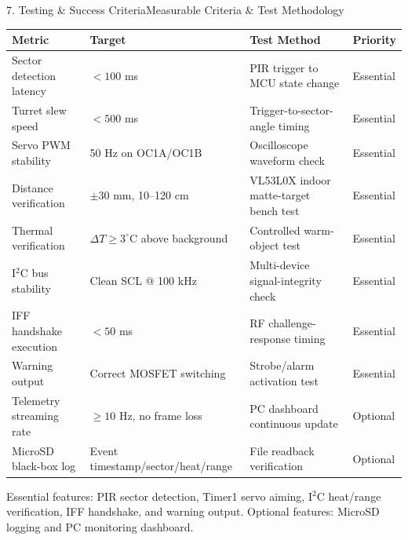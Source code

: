 \documentclass[aspectratio=169, 10pt]{beamer}
\begin{document}
\begin{frame}{7. Testing \& Success Criteria}{Measurable Criteria \& Test Methodology}
    \scriptsize
    \begin{table}
        \centering
        \begin{tabular}{llll}
            \toprule
            \textbf{\color{Accent} Metric} & \textbf{\color{Accent} Target} & \textbf{\color{Accent} Test Method} & \textbf{\color{Accent} Priority} \\
            \midrule
            Sector detection latency & $< 100$ ms & PIR trigger to MCU state change & Essential \\
            Turret slew speed & $< 500$ ms & Trigger-to-sector-angle timing & Essential \\
            Servo PWM stability & 50 Hz on OC1A/OC1B & Oscilloscope waveform check & Essential \\
            Distance verification & $\pm 30$ mm, 10--120 cm & VL53L0X indoor matte-target bench test & Essential \\
            Thermal verification & $\Delta T \ge 3^\circ$C above background & Controlled warm-object test & Essential \\
            I$^2$C bus stability & Clean SCL @ 100 kHz & Multi-device signal-integrity check & Essential \\
            IFF handshake execution & $< 50$ ms & RF challenge-response timing & Essential \\
            Warning output & Correct MOSFET switching & Strobe/alarm activation test & Essential \\
            Telemetry streaming rate & $\ge 10$ Hz, no frame loss & PC dashboard continuous update & Optional \\
            MicroSD black-box log & Event timestamp/sector/heat/range & File readback verification & Optional \\
            \bottomrule
        \end{tabular}
    \end{table}
    \vspace{0.15cm}
    \footnotesize\color{Dim} Essential features: PIR sector detection, Timer1 servo aiming, I$^2$C heat/range verification, IFF handshake, and warning output. Optional features: MicroSD logging and PC monitoring dashboard.
\end{frame}
\end{document}
